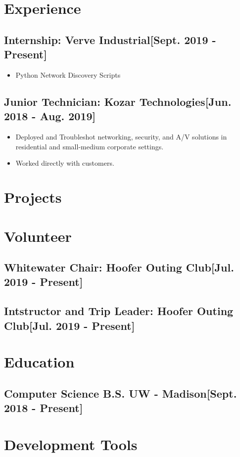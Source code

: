 \documentclass{article}
\begin{document}

\section{Experience}

    \subsection{\textbf{Internship}: Verve Industrial\hfill[Sept. 2019 - Present]}
        \begin{itemize}
            \item Python Network Discovery Scripts
        \end{itemize}

    \subsection{\textbf{Junior Technician}: Kozar Technologies\hfill[Jun. 2018 - Aug. 2019]}
        \begin{itemize}
            \item Deployed and Troubleshot networking, security, and A/V solutions in residential and small-medium corporate settings.
            \item Worked directly with customers.
        \end{itemize}

\section{Projects}

\section{Volunteer}

    \subsection{\textbf{Whitewater Chair}: Hoofer Outing Club\hfill[Jul. 2019 - Present]}

    \subsection{\textbf{Intstructor and Trip Leader}: Hoofer Outing Club\hfill[Jul. 2019 - Present]}

\section{Education}

    \subsection{\textbf{Computer Science B.S.} UW - Madison\hfill[Sept. 2018 - Present]}

\section{Development Tools}
\end{document}
